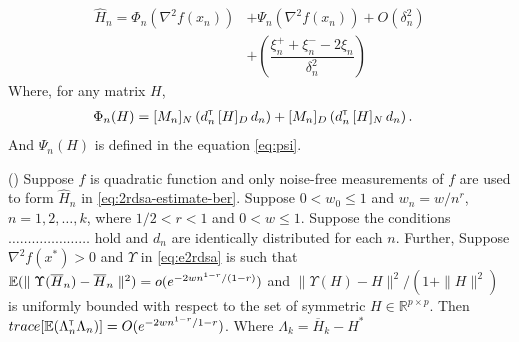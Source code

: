 

\begin{align}
 \widehat H_n =    \Phi_n(\nabla^2 f(x_n)) &+\Psi_{n}(\nabla^2 f(x_n)) +  O(\delta_n^2)\nonumber\\
&+\left(\dfrac{\xi_n^+ + \xi_n^- - 2 \xi_n}{\delta_n^2} \right) \label{eq:hnhat-ext}
\end{align}
Where, for any matrix $H$, 
\begin{align}
&\Phi_{n}(H) = [M_n]_{N}\left(d_{n}^\mathsf{\scriptscriptstyle T} \, [H]_{D} \, d_{n}\right) +  [M_n]_{D}\left(d_{n}^\mathsf{\scriptscriptstyle T} \, [H]_{N} \, d_{n}\right).
\end{align}
And $\Psi_n(H)$ is defined in the equation \eqref{eq:psi}.
\begin{theorem}(\textbf{})
\label{thm:quad-bound}
Suppose $f$ is quadratic function and only noise-free measurements  of $f$ are used to form $\widehat H_n$ in \eqref{eq:2rdsa-estimate-ber}. Suppose $0 < w_0\leq1$ and $w_n = w/n^r$, $n=1,2,\ldots,k$, where $1/2 < r < 1$ and $0 < w \leq 1$. Suppose the  conditions $\ldots\ldots\ldots\ldots\ldots\ldots\ldots$ hold and $d_n$ are identically distributed for each $n$. Further, Suppose $\nabla^2 f(x^*) > 0$ and $\Upsilon$ in \eqref{eq:e2rdsa} is such that $\mathbb{E}(\parallel \Upsilon(\overline H_n) - \overline H_n\parallel^2) = o(e^{-2wn^{1-r}/(1-r)})$ and $\parallel \Upsilon(H) - H \parallel^2 / (1+\parallel H \parallel^2)$ is uniformly bounded with respect to the set of symmetric $H \in \mathbb{R}^{p \times p}$. Then $trace[\mathbb{E} (\Lambda_n ^\mathsf{\scriptscriptstyle T} \Lambda_n)] = O(e^{-2wn^{1-r} / {1-r}})$. Where $\Lambda_k = \overline H_k - H^*$
\end{theorem}
